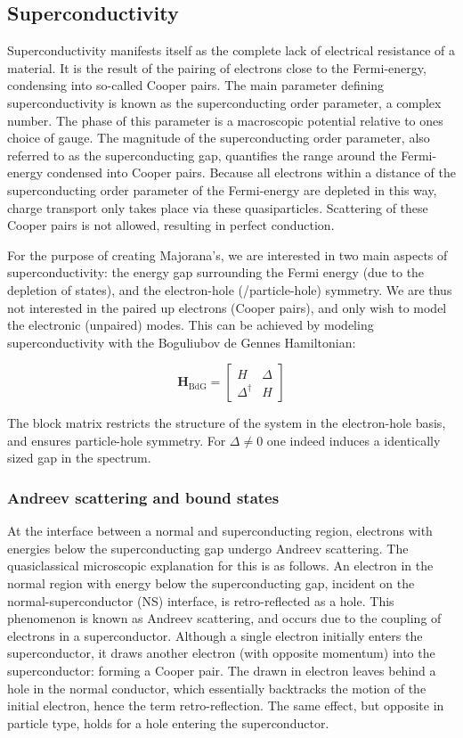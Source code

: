     
    \subsection{Superconductivity}
		Superconductivity manifests itself as the complete lack of electrical resistance of a material.
		It is the result of the pairing of electrons close to the Fermi-energy, condensing into so-called Cooper pairs.
		The main parameter defining superconductivity is known as the superconducting order parameter, a complex number.
		The phase of this parameter is a macroscopic potential relative to ones choice of gauge.
		The magnitude of the superconducting order parameter, also referred to as the superconducting gap, quantifies the range around the Fermi-energy condensed into Cooper pairs.
		Because all electrons within a distance of the superconducting order parameter of the Fermi-energy are depleted in this way, charge transport only takes place via these quasiparticles.
		Scattering of these Cooper pairs is not allowed, resulting in perfect conduction.

		For the purpose of creating Majorana's, we are interested in two main aspects of superconductivity: the energy gap surrounding the Fermi energy (due to the depletion of states), and the electron-hole (/particle-hole) symmetry.
		We are thus not interested in the paired up electrons (Cooper pairs), and only wish to model the electronic (unpaired) modes.
		This can be achieved by modeling superconductivity with the Boguliubov de Gennes Hamiltonian:
		
		\begin{equation}
		\mathbf{H}_\text{BdG} = \begin{bmatrix} H & \Delta \\ \Delta^\dagger & H \end{bmatrix}
		\end{equation}

		The block matrix restricts the structure of the system in the electron-hole basis, and ensures particle-hole symmetry.
		For $\Delta \neq 0$ one indeed induces a identically sized gap in the spectrum.

		\subsubsection{Andreev scattering and bound states}
			At the interface between a normal and superconducting region, electrons with energies below the superconducting gap undergo Andreev scattering.
			The quasiclassical microscopic explanation for this is as follows.
			An electron in the normal region with energy below the superconducting gap, incident on the normal-superconductor (NS) interface, is retro-reflected as a hole.
			This phenomenon is known as Andreev scattering, and occurs due to the coupling of electrons in a superconductor.
			Although a single electron initially enters the superconductor, it draws another electron (with opposite momentum) into the superconductor: forming a Cooper pair.
			The drawn in electron leaves behind a hole in the normal conductor, which essentially backtracks the motion of the initial electron, hence the term retro-reflection.
			The same effect, but opposite in particle type, holds for a hole entering the superconductor.


